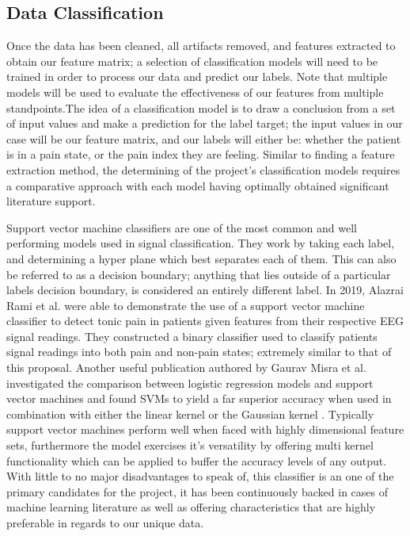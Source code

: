 \documentclass[12pt]{article}
\begin{document}
\subsection{Data Classification}

Once the data has been cleaned, all artifacts removed, and features extracted to obtain our feature matrix; a selection of classification models will need to be trained in order to process our data and predict our labels. Note that multiple models will be used to evaluate the effectiveness of our features from multiple standpoints.The idea of a classification model is to draw a conclusion from a set of input values and make a prediction for the label target; the input values in our case will be our feature matrix, and our labels will either be: whether the patient is in a pain state, or the pain index they are feeling. Similar to finding a feature extraction method, the determining of the project's classification models requires a comparative approach with each model having optimally obtained significant literature support.

Support vector machine classifiers are one of the most common and well performing models used in signal classification. They work by taking each label, and determining a hyper plane which best separates each of them. This can also be referred to as a decision boundary; anything that lies outside of a particular labels decision boundary, is considered an entirely different label. In 2019, Alazrai Rami et al. were able to demonstrate the use of a support vector machine classifier to detect tonic pain in patients given features from their respective EEG signal readings. They constructed a binary classifier used to classify patients signal readings into both pain and non-pain states; extremely similar to that of this proposal. Another useful publication authored by Gaurav Misra et al. investigated the comparison between logistic regression models and support vector machines and found SVMs to yield a far superior accuracy when used in combination with either the linear kernel or the Gaussian kernel \cite{Misra2017-xt}. Typically support vector machines perform  well when faced with highly dimensional feature sets, furthermore the model exercises it's versatility by offering multi kernel functionality which can be applied to buffer the accuracy levels of any output. With little to no major disadvantages to speak of, this classifier is an one of the primary candidates for the project, it has been continuously backed in cases of machine learning literature as well as offering characteristics that are highly preferable in regards to our unique data.
\end{document}
